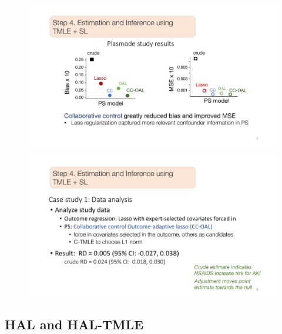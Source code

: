 \documentclass[t]{beamer}
\begin{document}
\begin{frame}
\centering
\begin{figure}
\begin{center}
\includegraphics[width=1.02\textwidth]{figures/abbviepdfslides_7.pdf}
\end{center}
\end{figure}
\end{frame}

\begin{frame}
\centering
\begin{figure}
\begin{center}
\includegraphics[width=1.02\textwidth]{figures/abbviepdfslides_8.pdf}
\end{center}
\end{figure}
\end{frame}

\subsection{HAL and HAL-TMLE}
\end{document}
